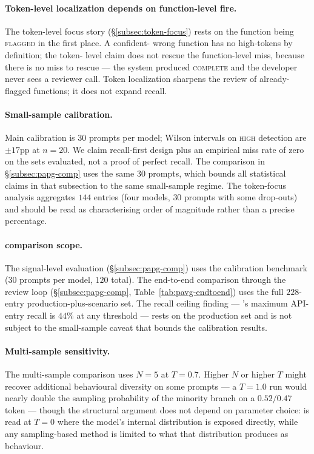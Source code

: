 \paragraph{Token-level localization depends on function-level fire.}
The token-level focus story (\S\ref{subsec:token-focus}) rests on
the function being \textsc{flagged} in the first place. A confident-%
wrong function has no high-\eps tokens by definition; the token-%
level claim does not rescue the function-level miss, because there
is no miss to rescue --- the system produced \textsc{complete} and
the developer never sees a reviewer call. Token localization
sharpens the review of already-flagged functions; it does not expand
recall.

\paragraph{Small-sample calibration.} Main calibration is $30$
prompts per model; Wilson intervals on \textsc{high} detection are
$\pm 17$pp at $n=20$. We claim recall-first design plus an empirical
miss rate of zero on the sets evaluated, not a proof of perfect
recall. The \papg comparison in \S\ref{subsec:papg-comp} uses the
same $30$ prompts, which bounds all statistical claims in that
subsection to the same small-sample regime. The token-focus
analysis aggregates $144$ entries (four models, $30$ prompts with
some drop-outs) and should be read as characterising order of
magnitude rather than a precise percentage.

\paragraph{\papg comparison scope.} The signal-level \papg evaluation
(\S\ref{subsec:papg-comp}) uses the calibration benchmark ($30$
prompts per model, $120$ total). The end-to-end comparison through
the review loop (\S\ref{subsec:papg-comp}, Table~\ref{tab:pavg-endtoend})
uses the full $228$-entry production-plus-scenario set. The recall
ceiling finding --- \papg's maximum API-entry recall is $44\%$ at
any threshold --- rests on the production set and is not subject to
the small-sample caveat that bounds the calibration results.

\paragraph{Multi-sample sensitivity.} The multi-sample comparison
uses $N=5$ at $T=0.7$. Higher $N$ or higher $T$ might recover
additional behavioural diversity on some prompts --- a $T=1.0$ run
would nearly double the sampling probability of the minority branch
on a $0.52/0.47$ token --- though the structural argument does not
depend on parameter choice: \eps is read at $T=0$ where the model's
internal distribution is exposed directly, while any sampling-based
method is limited to what that distribution produces as behaviour.

